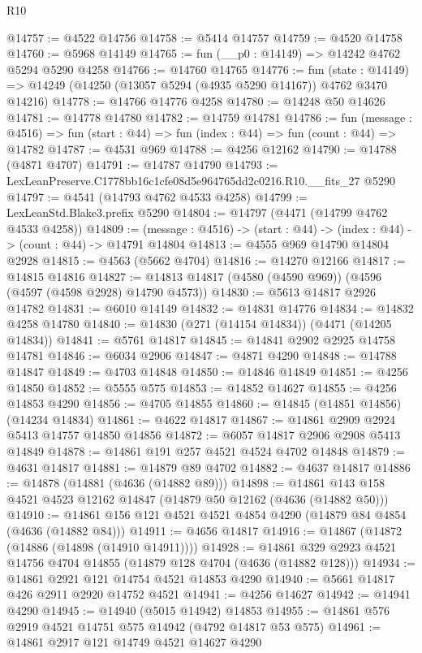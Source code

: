\begin{lexlean}{R10}
\begin{coremodule}
@14757 := @4522 @14756
@14758 := @5414 @14757
@14759 := @4520 @14758
@14760 := @5968 @14149
@14765 := fun (__p0 : @14149) => @14242 @4762 @5294 @5290 @4258
@14766 := @14760 @14765
@14776 := fun (state : @14149) =>
  @14249 (@14250 (@13057 @5294 (@4935 @5290 @14167)) @4762 @3470 @14216)
@14778 := @14766 @14776 @4258
@14780 := @14248 @50 @14626
@14781 := @14778 @14780
@14782 := @14759 @14781
@14786 := fun (message : @4516) =>
  fun (start : @44) => fun (index : @44) => fun (count : @44) => @14782
@14787 := @4531 @969
@14788 := @4256 @12162
@14790 := @14788 (@4871 @4707)
@14791 := @14787 @14790
@14793 := LexLeanPreserve.C1778bb16c1cfe08d5e964765dd2c0216.R10.__fits_27 @5290
@14797 := @4541 (@14793 @4762 @4533 @4258)
@14799 := LexLeanStd.Blake3.prefix @5290
@14804 := @14797 (@4471 (@14799 @4762 @4533 @4258))
@14809 := (message : @4516) -> (start : @44) -> (index : @44) -> (count : @44) -> @14791 @14804
@14813 := @4555 @969 @14790 @14804 @2928
@14815 := @4563 (@5662 @4704)
@14816 := @14270 @12166
@14817 := @14815 @14816
@14827 := @14813 @14817 (@4580 (@4590 @969)) (@4596 (@4597 (@4598 @2928) @14790 @4573))
@14830 := @5613 @14817 @2926 @14782
@14831 := @6010 @14149
@14832 := @14831 @14776
@14834 := @14832 @4258 @14780
@14840 := @14830 (@271 (@14154 @14834)) (@4471 (@14205 @14834))
@14841 := @5761 @14817
@14845 := @14841 @2902 @2925 @14758 @14781
@14846 := @6034 @2906
@14847 := @4871 @4290
@14848 := @14788 @14847
@14849 := @4703 @14848
@14850 := @14846 @14849
@14851 := @4256 @14850
@14852 := @5555 @575
@14853 := @14852 @14627
@14855 := @4256 @14853 @4290
@14856 := @4705 @14855
@14860 := @14845 (@14851 @14856) (@14234 @14834)
@14861 := @4622 @14817
@14867 := @14861 @2909 @2924 @5413 @14757 @14850 @14856
@14872 := @6057 @14817 @2906 @2908 @5413 @14849
@14878 := @14861 @191 @257 @4521 @4524 @4702 @14848
@14879 := @4631 @14817
@14881 := @14879 @89 @4702
@14882 := @4637 @14817
@14886 := @14878 (@14881 (@4636 (@14882 @89)))
@14898 := @14861 @143 @158 @4521 @4523 @12162 @14847 (@14879 @50 @12162 (@4636 (@14882 @50)))
@14910 := @14861 @156 @121 @4521 @4521 @4854 @4290 (@14879 @84 @4854 (@4636 (@14882 @84)))
@14911 := @4656 @14817
@14916 := @14867 (@14872 (@14886 (@14898 (@14910 @14911))))
@14928 := @14861 @329 @2923 @4521 @14756 @4704 @14855 (@14879 @128 @4704 (@4636 (@14882 @128)))
@14934 := @14861 @2921 @121 @14754 @4521 @14853 @4290
@14940 := @5661 @14817 @426 @2911 @2920 @14752 @4521
@14941 := @4256 @14627
@14942 := @14941 @4290
@14945 := @14940 (@5015 @14942) @14853
@14955 := @14861 @576 @2919 @4521 @14751 @575 @14942 (@4792 @14817 @53 @575)
@14961 := @14861 @2917 @121 @14749 @4521 @14627 @4290

\end{coremodule}
\end{lexlean}
